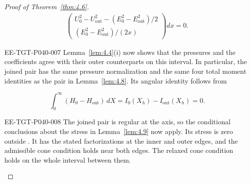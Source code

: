 \begin{proof}[Proof of Theorem~\ref{thm:4.6}]
\begin{align*}
\begin{pmatrix}
U_0^2-U_{\mathrm{out}}^2-(E_0^2-E_{\mathrm{out}}^2)/2\\
(E_0^2-E_{\mathrm{out}}^2)/(2x)
\end{pmatrix}dx=0.
\end{align*}
\begin{EESegment}{EE-TGT-P040-007}
Lemma~\ref{lem:4.4}(i) now shows that the pressures and the coefficients
 agree with their
outer counterparts on this interval. In particular, the joined pair has the same pressure
normalization and the same four total moment identities as the pair in Lemma~\ref{lem:4.8}. Its
angular identity follows from
\end{EESegment}
\[
\int_0^\infty(H_0-H_{\mathrm{out}})\,dX
=I_0(X_h)-I_{\mathrm{out}}(X_h)=0.
\]
\begin{EESegment}{EE-TGT-P040-008}
The joined pair is regular at the axis, so the conditional conclusions about the stress in
Lemma~\ref{lem:4.9} now apply. Its stress is zero outside
. It has the stated factorizations at the inner and outer edges,
and the admissible cone condition holds near both edges. The relaxed cone condition holds on the
whole interval between them.
\end{EESegment}


\end{proof}
